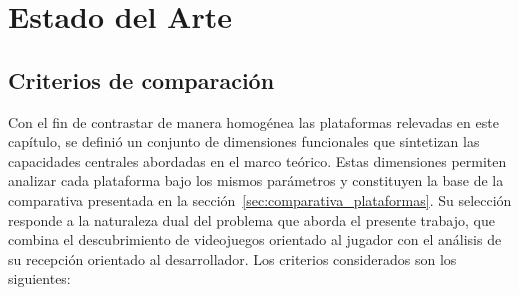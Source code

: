 \chapter{Estado del Arte}\label{chapter:estado_arte}

\section{Criterios de comparación}\label{sec:criterios_comparacion}

Con el fin de contrastar de manera homogénea las plataformas relevadas en este capítulo, se definió un conjunto de dimensiones funcionales que sintetizan las capacidades centrales abordadas en el marco teórico. Estas dimensiones permiten analizar cada plataforma bajo los mismos parámetros y constituyen la base de la comparativa presentada en la sección~\ref{sec:comparativa_plataformas}. Su selección responde a la naturaleza dual del problema que aborda el presente trabajo, que combina el descubrimiento de videojuegos orientado al jugador con el análisis de su recepción orientado al desarrollador. Los criterios considerados son los siguientes:

